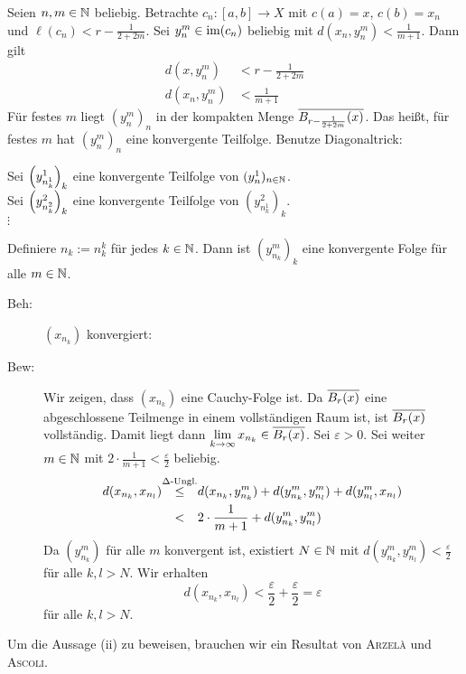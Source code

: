 \begin{beweis}[zu (i)]
		Seien $n,m \in \NN$ beliebig.
		Betrachte $c_n\colon [a,b] \rightarrow X$ mit $c(a) = x$, $c(b) = x_n$ und $\ell(c_n) < r - \frac{1}{2+2m}$. Sei $y_n^m \in \im(c_n)$ beliebig mit $d(x_n,y_n^m) < \frac{1}{m+1}$. Dann gilt
		\begin{align*}
			d(x,y_n^m) &< r - \frac{1}{2+2m} \\
			d(x_n,y_n^m) &< \frac{1}{m+1}
		\end{align*}
		Für festes $m$ liegt $(y_n^m)_n$ in der kompakten Menge $\ol{B_{r-\frac{1}{2+2m}}(x)}$.
		Das heißt, für festes $m$ hat $(y_n^m)_n$ eine konvergente Teilfolge. Benutze Diagonaltrick:
		\begin{center}
			Sei $\enbrace*{y_{n^1_k}^1}_k$ eine konvergente Teilfolge von $(y_n^1)_{n \in \NN}$. \\
			Sei $\enbrace*{y_{n^2_k}^2}_k$ eine konvergente Teilfolge von $(y_{n^1_k}^2)_k$. \\
			$\vdots$
		\end{center}
		Definiere $n_k := n_k^k$ für jedes $k \in \NN$.
		Dann ist $(y_{n_k}^m)_k$ eine konvergente Folge für alle $m \in \NN$.
		\begin{description}
			\item[Beh:]  $(x_{n_k})$ konvergiert:
			\item[Bew:] Wir zeigen, dass $(x_{n_k})$ eine Cauchy-Folge ist.
			Da $\ol{B_r(x)}$ eine abgeschlossene Teilmenge in einem vollständigen Raum ist, ist $\ol{B_r(x)}$ vollständig.
			Damit liegt dann $\lim\limits_{k \rightarrow \infty} x_{n_k} \in \ol{B_r(x)}$.
			Sei $\varepsilon > 0$.
			Sei weiter $m \in \NN$ mit $2 \cdot \frac{1}{m+1} < \frac{\varepsilon}{2}$ beliebig.
			\begin{align*}
				d(x_{n_k},x_{n_l}) &\stack{\Delta\text{-Ungl.}}{\leq} d(x_{n_k},y_{n_k}^m) + d(y_{n_k}^m,y_{n_l}^m) + d(y_{n_l}^m,x_{n_l}) \\
				&\stack{}{<} 2 \cdot \frac{1}{m+1} + d(y_{n_k}^m, y_{n_l}^m)
			\end{align*}
			Da $(y_{n_k}^m)$ für alle $m$ konvergent ist, existiert $N \in \NN$ mit $d(y_{n_k}^m,y_{n_l}^m) < \frac{\varepsilon}{2}$ für alle $k,l > N$. Wir erhalten
			\[
				d(x_{n_k},x_{n_l}) < \frac{\varepsilon}{2} + \frac{\varepsilon}{2} = \varepsilon
			\]
			für alle $k,l > N$. 
		\end{description}
\end{beweis}

Um die Aussage (ii) zu beweisen, brauchen wir ein Resultat von \textsc{Arzelà} und \textsc{Ascoli}. 

